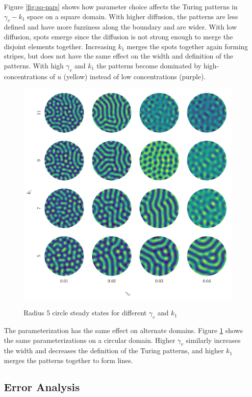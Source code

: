 Figure \ref{fig:sq-pars} shows how parameter choice affects the Turing patterns in $\gamma_v - k_1$ space on a square domain. With higher diffusion, the patterns are less defined and have more fuzziness along the boundary and are wider. With low diffusion, spots emerge since the diffusion is not strong enough to merge the disjoint elements together. Increasing $k_1$ merges the spots together again forming stripes, but does not have the same effect on the width and definition of the patterns. With high $\gamma_v$ and $k_1$ the patterns become dominated by high-concentrations of $u$ (yellow) instead of low concentrations (purple).

\begin{figure}[t!]
    \centering
    \caption{Radius 5 circle steady states for different $\gamma_v$ and $k_1$}
    \includegraphics{figures/circle_params.pdf}
    \label{fig:cir-pars}
\end{figure}

The parameterization has the same effect on alternate domains. Figure \ref{fig:cir-pars} shows the same parameterizations on a circular domain. Higher $\gamma_v$ similarly increases the width and decreases the definition of the Turing patterns, and higher $k_1$ merges the patterns together to form lines.


\subsection{Error Analysis} \label{subsec:err}

